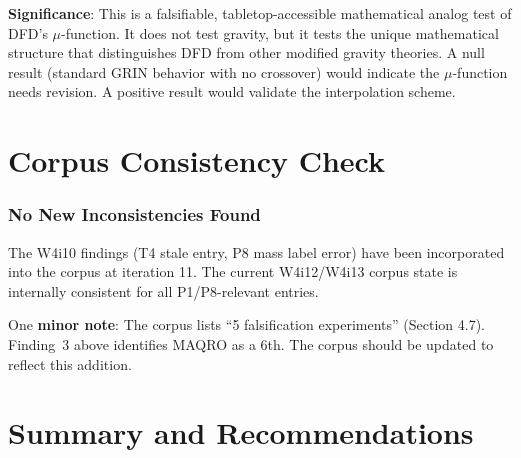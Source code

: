 \documentclass[11pt]{article}
\begin{document}
\textbf{Significance}: This is a falsifiable, tabletop-accessible
mathematical analog test of DFD's $\mu$-function. It does not test
gravity, but it tests the unique mathematical structure that
distinguishes DFD from other modified gravity theories. A null result
(standard GRIN behavior with no crossover) would indicate the
$\mu$-function needs revision. A positive result would validate the
interpolation scheme.


\part{Corpus Consistency Check}

\section{No New Inconsistencies Found}

The W4i10 findings (T4 stale entry, P8 mass label error) have been
incorporated into the corpus at iteration 11. The current W4i12/W4i13
corpus state is internally consistent for all P1/P8-relevant entries.

One \textbf{minor note}: The corpus lists ``5 falsification experiments''
(Section 4.7). Finding~3 above identifies MAQRO as a 6th. The corpus
should be updated to reflect this addition.


\part{Summary and Recommendations}
\end{document}
